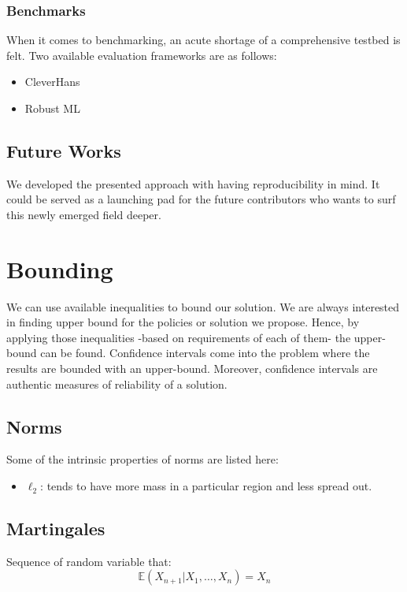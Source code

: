 \documentclass[letterpaper,12pt]{article}
\begin{document}
\subsubsection{Benchmarks}
When it comes to benchmarking, an acute shortage of a comprehensive testbed is felt. Two available evaluation frameworks are as follows:
\begin{itemize}
    \item CleverHans \cite{Papernot2016}
    \item Robust ML 
\end{itemize}
 

\subsection{Future Works}
We developed the presented approach with having reproducibility in mind. It could be served as a launching pad for the future contributors who wants to surf this newly emerged field deeper.


\section{Bounding}
We can use available inequalities to bound our solution. We are always interested in finding upper bound for the policies or solution we propose. Hence, by applying those inequalities -based on requirements of each of them- the upper-bound can be found. Confidence intervals come into the problem where the results are bounded with an upper-bound. Moreover, confidence intervals are authentic measures of reliability of a solution.

\subsection{Norms}
Some of the intrinsic properties of norms are listed here:
\begin{itemize}
    \item $\ell_2$: tends to have more mass in a particular region and less spread out. 
\end{itemize}

\subsection{Martingales}
Sequence of random variable that:
\begin{equation}
    \mathbb { E } \left( X _ { n + 1 } | X _ { 1 } , \ldots , X _ { n } \right) = X _ { n }
\end{equation}
\end{document}
